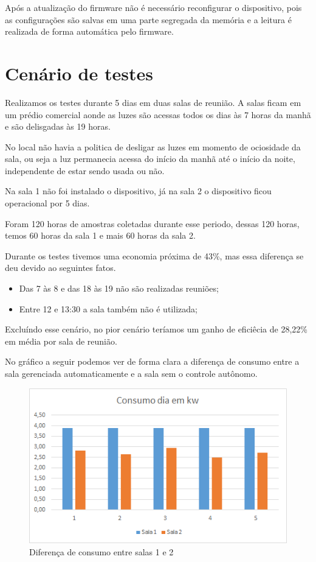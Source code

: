 \documentclass[openright]{normas-utf-tex} %
\begin{document}
Após a atualização do firmware não é necessário reconfigurar o dispositivo, pois as configurações são salvas em uma parte segregada da memória e a leitura é realizada de forma automática pelo firmware.

\section{Cenário de testes}
Realizamos os testes durante 5 dias em duas salas de reunião. A salas ficam em um prédio comercial aonde as luzes são acessas todos os dias às 7 horas da manhã e são delisgadas às 19 horas.

No local não havia a politica de desligar as luzes em momento de ociosidade da sala, ou seja a luz permanecia acessa do início da manhã até o início da noite, independente de estar sendo usada ou não. 

Na sala 1 não foi instalado o dispositivo, já na sala 2 o dispositivo ficou operacional por 5 dias.

Foram 120 horas de amostras coletadas durante esse periodo, dessas 120 horas, temos 60 horas da sala 1 e mais 60 horas da sala 2.

Durante os testes tivemos uma economia próxima de 43\%, mas essa diferença se deu devido ao seguintes fatos. 

\begin{itemize}
    \item Das 7 às 8 e das 18 às 19 não são realizadas reuniões;
    \item Entre 12 e 13:30 a sala também não é utilizada;
\end{itemize}

Excluíndo esse cenário, no pior cenário teríamos um ganho de eficiêcia de 28,22\% em média por sala de reunião.

No gráfico a seguir podemos ver de forma clara a diferença de consumo entre a sala gerenciada automaticamente e a sala sem o controle autônomo. 

\begin{figure}[!htb]
     \centering
     \includegraphics[scale=0.8]{g2.png}
     \caption{Diferença de consumo entre salas 1 e 2}
     \label{}
\end{figure}
\end{document}
